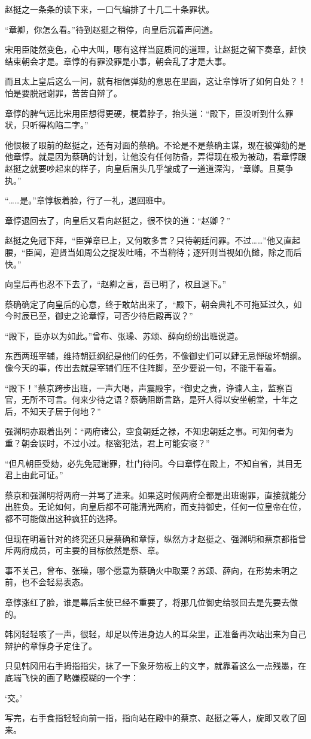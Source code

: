 赵挺之一条条的读下来，一口气编排了十几二十条罪状。

“章卿，你怎么看。”待到赵挺之稍停，向皇后沉着声问道。

宋用臣陡然变色，心中大叫，哪有这样当庭质问的道理，让赵挺之留下奏章，赶快结束朝会才是。章惇的有罪没罪是小事，朝会乱了才是大事。

而且太上皇后这么一问，就有相信弹劾的意思在里面，这让章惇听了如何自处？！怕是要脱冠谢罪，苦苦自辩了。

章惇的脾气远比宋用臣想得更硬，梗着脖子，抬头道：“殿下，臣没听到什么罪状，只听得构陷二字。”

他恨极了眼前的赵挺之，还有对面的蔡确。不论是不是蔡确主谋，现在被弹劾的是他章惇。就是因为蔡确的计划，让他没有任何防备，弄得现在极为被动，看章惇跟赵挺之就要吵起来的样子，向皇后眉头几乎皱成了一道道深沟，“章卿。且莫争执。”

“……是。”章惇板着脸，行了一礼，退回班中。

章惇退回去了，向皇后又看向赵挺之，很不快的道：“赵卿？”

赵挺之免冠下拜，“臣弹章已上，又何敢多言？只待朝廷问罪。不过……”他又直起腰，“臣闻，迎贤当如周公之捉发吐哺，不当稍待；逐歼则当视如仇雠，除之而后快。”

向皇后再也忍不下去了，“赵卿之言，吾已明了，权且退下。”

蔡确确定了向皇后的心意，终于敢站出来了，“殿下，朝会典礼不可拖延过久，如今时辰已至，御史之论章惇，可否少待后殿再议？”

“殿下，臣亦以为如此。”曾布、张璪、苏颂、薛向纷纷出班说道。

东西两班宰辅，维持朝廷纲纪是他们的任务，不像御史们可以肆无忌惮破坏朝纲。像今天的事，传出去就是宰辅们压不住阵脚，至少要说一句，不能干看着。

“殿下！”蔡京跨步出班，一声大喝，声震殿宇，“御史之责，诤谏人主，监察百官，无所不可言。何来少待之语？蔡确阻断言路，是歼人得以安坐朝堂，十年之后，不知天子居于何地？”

强渊明亦跟着出列：“两府诸公，空食朝廷之禄，不知忠朝廷之事。可知何者为重？朝会误时，不过小过。枢密犯法，君上可能安寝？”

“但凡朝臣受劾，必先免冠谢罪，杜门待问。今曰章惇在殿上，不知自省，其目无君上由此可证。”

蔡京和强渊明将两府一并骂了进来。如果这时候两府全都是出班谢罪，直接就能分出胜负。无论如何，向皇后都不可能清光两府，而支持御史，任何一位皇帝在位，都不可能做出这种疯狂的选择。

但现在明着针对的终究还只是蔡确和章惇，纵然方才赵挺之、强渊明和蔡京都指曾斥两府成员，可主要的目标依然是蔡、章。

事不关己，曾布、张璪，哪个愿意为蔡确火中取栗？苏颂、薛向，在形势未明之前，也不会轻易表态。

章惇涨红了脸，谁是幕后主使已经不重要了，将那几位御史给驳回去是先要去做的。

韩冈轻轻咳了一声，很轻，却足以传进身边人的耳朵里，正准备再次站出来为自己辩护的章惇身子定住了。

只见韩冈用右手拇指指尖，抹了一下象牙笏板上的文字，就靠着这么一点残墨，在底端飞快的画了略嫌模糊的一个字：

‘交。’

写完，右手食指轻轻向前一指，指向站在殿中的蔡京、赵挺之等人，旋即又收了回来。

